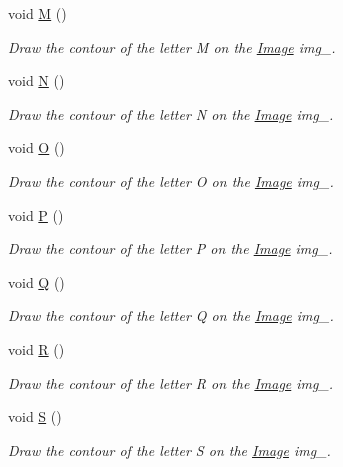 \begin{DoxyCompactItemize}
void \mbox{\hyperlink{class_font_v1_a69afdf545ed6bccbb31efaef5d6d4219}{M}} ()
\begin{DoxyCompactList}\small\item\em Draw the contour of the letter M on the \mbox{\hyperlink{class_image}{Image}} img\+\_\+. \end{DoxyCompactList}\item 
void \mbox{\hyperlink{class_font_v1_a725c93ea00d851ca5b43c0d594f1d6d0}{N}} ()
\begin{DoxyCompactList}\small\item\em Draw the contour of the letter N on the \mbox{\hyperlink{class_image}{Image}} img\+\_\+. \end{DoxyCompactList}\item 
void \mbox{\hyperlink{class_font_v1_a9338f8d780e9913a848310355973ebf3}{O}} ()
\begin{DoxyCompactList}\small\item\em Draw the contour of the letter O on the \mbox{\hyperlink{class_image}{Image}} img\+\_\+. \end{DoxyCompactList}\item 
void \mbox{\hyperlink{class_font_v1_aeaf56ebe48a78aedf53626f50f10ee4d}{P}} ()
\begin{DoxyCompactList}\small\item\em Draw the contour of the letter P on the \mbox{\hyperlink{class_image}{Image}} img\+\_\+. \end{DoxyCompactList}\item 
void \mbox{\hyperlink{class_font_v1_af7ffd76bf02756d0d1e2d3eab4c65c40}{Q}} ()
\begin{DoxyCompactList}\small\item\em Draw the contour of the letter Q on the \mbox{\hyperlink{class_image}{Image}} img\+\_\+. \end{DoxyCompactList}\item 
void \mbox{\hyperlink{class_font_v1_ab3f9a7e62f7d08792d9028da68f5787e}{R}} ()
\begin{DoxyCompactList}\small\item\em Draw the contour of the letter R on the \mbox{\hyperlink{class_image}{Image}} img\+\_\+. \end{DoxyCompactList}\item 
void \mbox{\hyperlink{class_font_v1_ab6daa08377051d5af458003c665cfc09}{S}} ()
\begin{DoxyCompactList}\small\item\em Draw the contour of the letter S on the \mbox{\hyperlink{class_image}{Image}} img\+\_\+. \end{DoxyCompactList}\item 

\end{DoxyCompactItemize}
